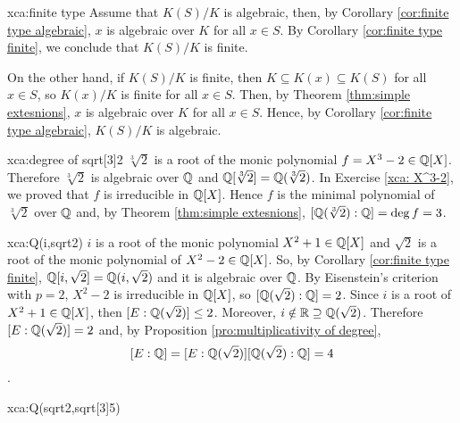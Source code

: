 \begin{sol}{xca:finite type}
    Assume that $K(S)/K$ is algebraic, then, by Corollary \ref{cor:finite type algebraic}, 
    $x$ is algebraic over $K$ for all $x\in S$.
    By Corollary \ref{cor:finite type finite}, we conclude that $K(S)/K$ is finite.

    On the other hand, if $K(S)/K$ is finite, then
    $K\subseteq K(x)\subseteq K(S)$ for all $x\in S$, so
    $K(x)/K$ is finite for all $x\in S$.
    Then, by Theorem \ref{thm:simple extesnions},
    $x$ is algebraic over $K$ for all $x\in S$.
    Hence, by Corollary \ref{cor:finite type algebraic}, $K(S)/K$ is algebraic.
 \end{sol}

\begin{sol}{xca:degree of sqrt[3]2}
    $\sqrt[3]{2}$ is a root of the monic polynomial $f=X^3-2\in \mathbb{Q}[X]$.
    Therefore $\sqrt[3]{2}$ is algebraic over $\mathbb{Q}$ 
    and $\mathbb{Q}[\sqrt[3]{2}]=\mathbb{Q}(\sqrt[3]{2})$.
    In Exercise \ref{xca: X^3-2}, we proved that
    $f$ is irreducible in $\mathbb{Q}[X]$.
    Hence $f$ is the minimal polynomial of $\sqrt[3]{2}$
    over $\mathbb{Q}$ and, by Theorem \ref{thm:simple extesnions},
    $[\mathbb{Q}(\sqrt[3]{2}):\mathbb{Q}]=\deg f=3$.
\end{sol}

\begin{sol}{xca:Q(i,sqrt2)}
    $i$ is a root of the monic polynomial $X^2+1\in\mathbb{Q}[X]$
    and $\sqrt{2}$ is a root of the monic polynomial of 
    $X^2-2\in\mathbb{Q}[X]$.
    So, by Corollary \ref{cor:finite type finite},
     $\mathbb{Q}[i,\sqrt{2}]=\mathbb{Q}(i,\sqrt{2})$ and it is algebraic over $\mathbb{Q}$.
    By Eisenstein's criterion with $p=2$,
    $X^2-2$ is irreducible in $\mathbb{Q}[X]$, so 
    $[\mathbb{Q}(\sqrt{2}):\mathbb{Q}]=2$.
    Since $i$ is a root of $X^2+1\in\mathbb{Q}[X]$,
    then $[E:\mathbb{Q}(\sqrt{2})]\leq 2$.
    Moreover, $i\notin \mathbb{R}\supseteq \mathbb{Q}(\sqrt{2})$.
    Therefore $[E:\mathbb{Q}(\sqrt{2})]=2$ and,
    by Proposition \ref{pro:multiplicativity of degree},
    $$[E:\mathbb{Q}]=[E:\mathbb{Q}(\sqrt{2})][\mathbb{Q}(\sqrt{2}):\mathbb{Q}]=4$$.
\end{sol}

\begin{sol}{xca:Q(sqrt2,sqrt[3]5)}
    
\end{sol}

